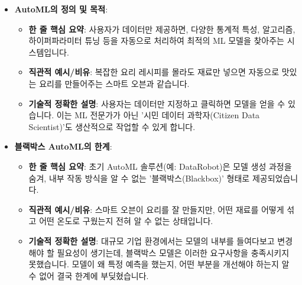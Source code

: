 \documentclass[11pt,a4paper]{article}
\theoremstyle{definition}
\begin{document}
\begin{itemize}
    \item \textbf{AutoML의 정의 및 목적}:
    \begin{itemize}
        \item \textbf{한 줄 핵심 요약}: 사용자가 데이터만 제공하면, 다양한 통계적 특성, 알고리즘, 하이퍼파라미터 튜닝 등을 자동으로 처리하여 최적의 ML 모델을 찾아주는 시스템입니다.
        \item \textbf{직관적 예시/비유}: 복잡한 요리 레시피를 몰라도 재료만 넣으면 자동으로 맛있는 요리를 만들어주는 스마트 오븐과 같습니다.
        \item \textbf{기술적 정확한 설명}: 사용자는 데이터만 지정하고 클릭하면 모델을 얻을 수 있습니다. 이는 ML 전문가가 아닌 '시민 데이터 과학자(Citizen Data Scientist)'도 생산적으로 작업할 수 있게 합니다.
    \end{itemize}

    \item \textbf{블랙박스 AutoML의 한계}:
    \begin{itemize}
        \item \textbf{한 줄 핵심 요약}: 초기 AutoML 솔루션(예: DataRobot)은 모델 생성 과정을 숨겨, 내부 작동 방식을 알 수 없는 '블랙박스(Blackbox)' 형태로 제공되었습니다.
        \item \textbf{직관적 예시/비유}: 스마트 오븐이 요리를 잘 만들지만, 어떤 재료를 어떻게 섞고 어떤 온도로 구웠는지 전혀 알 수 없는 상태입니다.
        \item \textbf{기술적 정확한 설명}: 대규모 기업 환경에서는 모델의 내부를 들여다보고 변경해야 할 필요성이 생기는데, 블랙박스 모델은 이러한 요구사항을 충족시키지 못했습니다. 모델이 왜 특정 예측을 했는지, 어떤 부분을 개선해야 하는지 알 수 없어 결국 한계에 부딪혔습니다.
    \end{itemize}


\end{itemize}
\end{document}
